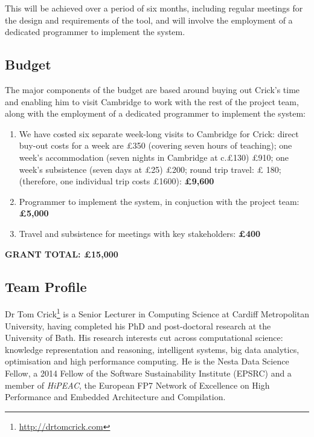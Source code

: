\documentclass[a4paper,11pt]{article}
\begin{document}
This will be achieved over a period of six months, including regular
meetings for the design and requirements of the tool, and will involve
the employment of a dedicated programmer to implement the system.






\subsection*{Budget}

The major components of the budget are based around buying out Crick's
time and enabling him to visit Cambridge to work with the rest of the
project team, along with the employment of a dedicated programmer to
implement the system:

\begin{enumerate}
\item We have costed six separate week-long visits to Cambridge for
Crick: direct buy-out costs for a week are \pounds 350 (covering seven
hours of teaching); one week's accommodation (seven nights in
Cambridge at c.\pounds 130) \pounds 910; one week's subsistence (seven days at \pounds 25) \pounds 200; round trip travel: \pounds
180; (therefore, one individual trip costs \pounds 1600): \hfill {\textbf{\pounds 9,600}}

\item Programmer to implement the system, in conjuction with the
  project team: \hfill {\textbf{\pounds 5,000}}

\item Travel and subsistence for meetings with key stakeholders:
  \hfill {\textbf{\pounds 400}}
\end{enumerate}

{\textbf{GRANT TOTAL: \hfill \pounds 15,000}}

\subsection*{Team Profile}

Dr Tom Crick\footnote{\url{http://drtomcrick.com}} is a Senior Lecturer in
Computing Science at Cardiff Metropolitan University, having completed
his PhD and post-doctoral research at the University of Bath. His
research interests cut across computational science: knowledge
representation and reasoning, intelligent systems, big data analytics,
optimisation and high performance computing.  He is the Nesta Data
Science Fellow, a 2014 Fellow of the Software Sustainability Institute
(EPSRC) and a member of {\emph{HiPEAC}}, the European FP7 Network of
Excellence on High Performance and Embedded Architecture and
Compilation.
\end{document}
